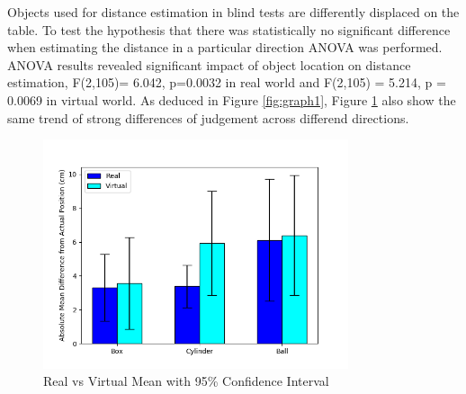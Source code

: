 Objects used for distance estimation in blind tests are differently displaced on the table. To test the hypothesis that there was statistically no significant difference when estimating the distance in a particular direction ANOVA was performed. ANOVA results revealed significant impact of object location on distance estimation, F(2,105)= 6.042, p=0.0032 in real world and F(2,105) = 5.214, p = 0.0069 in virtual world. As deduced in Figure \ref{fig:graph1}, Figure \ref{fig:graph2} also show the same trend of strong differences of judgement across differend directions.  
\begin{figure}[h]
    \centering
    \includegraphics[width=0.8\textwidth]{./images/blind111.png}
    \caption{Real vs Virtual Mean with 95\% Confidence Interval}
    \label{fig:graph2}
\end{figure} 

